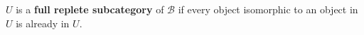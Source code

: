 $U$ is a \textbf{full replete subcategory} of $\mathcal{B}$ if every object isomorphic to an object in $U$ is already in $U$.
